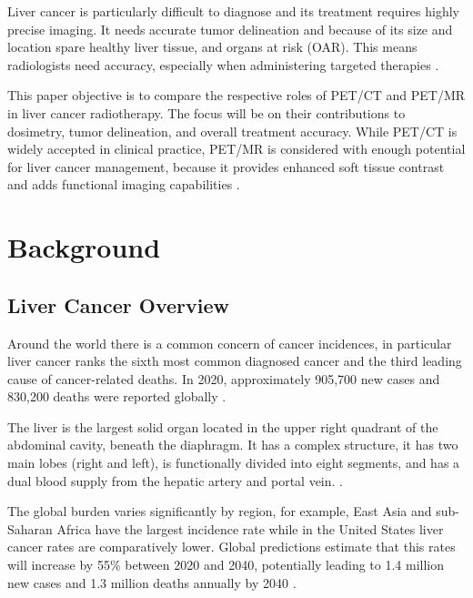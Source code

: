 \documentclass[11pt]{article} %
\begin{document}
\begin{multicols}{2}

Liver cancer is particularly difficult to diagnose and its treatment requires highly precise imaging. It needs accurate tumor delineation and because of its size and location spare healthy liver tissue, and organs at risk (OAR). This means radiologists need accuracy, especially when administering targeted therapies \cite{beaton2019, floridi2022}.

This paper objective is to compare the respective roles of PET/CT and PET/MR in liver cancer radiotherapy. The focus will be on their contributions to dosimetry, tumor delineation, and overall treatment accuracy. While PET/CT is widely accepted in clinical practice, PET/MR is considered with enough potential for liver cancer management, because it provides enhanced soft tissue contrast and adds functional imaging capabilities \cite{decazes2021, yan2024}.

\section{Background}

\subsection{Liver Cancer Overview}
Around the world there is a common concern of cancer incidences, in particular liver cancer ranks the sixth most common diagnosed cancer and the third leading cause of cancer-related deaths. In 2020, approximately 905,700 new cases and 830,200 deaths were reported globally \cite{journal_of_hepatology2022}. 

The liver is the largest solid organ located in the upper right quadrant of the abdominal cavity, beneath the diaphragm. It has a complex structure,  it has two main lobes (right and left), is functionally divided into eight segments, and has a dual blood supply from the hepatic artery and portal vein. \cite{ozmen2020}.

The global burden varies significantly by region, for example, East Asia and sub-Saharan Africa have the largest incidence rate while in the United States liver cancer rates are comparatively lower. Global predictions estimate that this rates will increase by 55\% between 2020 and 2040, potentially leading to 1.4 million new cases and 1.3 million deaths annually by 2040 \cite{journal_of_hepatology2022}.


\end{multicols}
\end{document}
